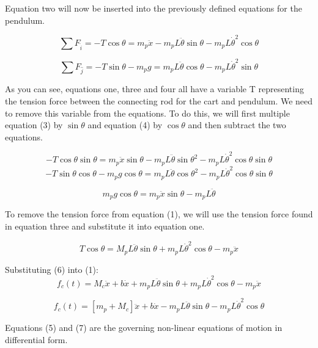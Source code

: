 \documentclass[titlepage]{article}
\begin{document}
Equation two will now be inserted into the previously defined equations for the pendulum.

\begin{equation}
\sum{}{F_{\hat{i}}} = -T\cos{\theta} = m_{p}\ddot{x} - m_{p}L\ddot{\theta}\sin{\theta} - m_{p}L\dot{\theta}^{2}\cos{\theta}
\end{equation}

\begin{equation}
\sum{}{F_{\hat{j}}} = -T\sin{\theta} - m_{p}g = m_{p}L\ddot{\theta}\cos{\theta} - m_{p}L\dot{\theta}^{2}\sin{\theta}
\end{equation}

As you can see, equations one, three and four all have a variable T representing the tension force between the connecting rod for the cart and pendulum. We need to remove this variable from the equations. To do this, we will first multiple equation (3) by \(\sin{\theta}\) and equation (4) by \(\cos{\theta}\) and then subtract the two equations.

\[-T\cos{\theta}\sin{\theta} = m_{p}\ddot{x}\sin{\theta} - m_{p}L\ddot{\theta}\sin{\theta}^2 - m_{p}L\dot{\theta}^{2}\cos{\theta}\sin{\theta}\]
\[-T\sin{\theta}\cos{\theta} - m_{p}g\cos{\theta} = m_{p}L\ddot{\theta}\cos{\theta}^2 - m_{p}L\dot{\theta}^{2}\cos{\theta}\sin{\theta}\]

\begin{equation}
m_{p}g\cos{\theta} = m_{p}\ddot{x}\sin{\theta} - m_{p}L\ddot{\theta}
\end{equation}

To remove the tension force from equation (1), we will use the tension force found in equation three and substitute it into equation one.

\begin{equation}
T\cos{\theta} = M_{p}L\ddot{\theta}\sin{\theta} + m_{p}L\dot{\theta}^{2}\cos{\theta} - m_{p}\ddot{x}
\end{equation}

Substituting (6) into (1):
\[ f_{c}\left(t\right) = M_{c}\ddot{x} + b\dot{x} +  m_{p}L\ddot{\theta}\sin{\theta} + m_{p}L\dot{\theta}^{2}\cos{\theta} - m_{p}\ddot{x}\]

\begin{equation}
f_{c}\left(t\right) = \left[m_{p} + M_{c}\right]\ddot{x} + b\dot{x} -  m_{p}L\ddot{\theta}\sin{\theta} - m_{p}L\dot{\theta}^{2}\cos{\theta}
\end{equation}

Equations (5) and (7) are the governing non-linear equations of motion in differential form.
\end{document}
